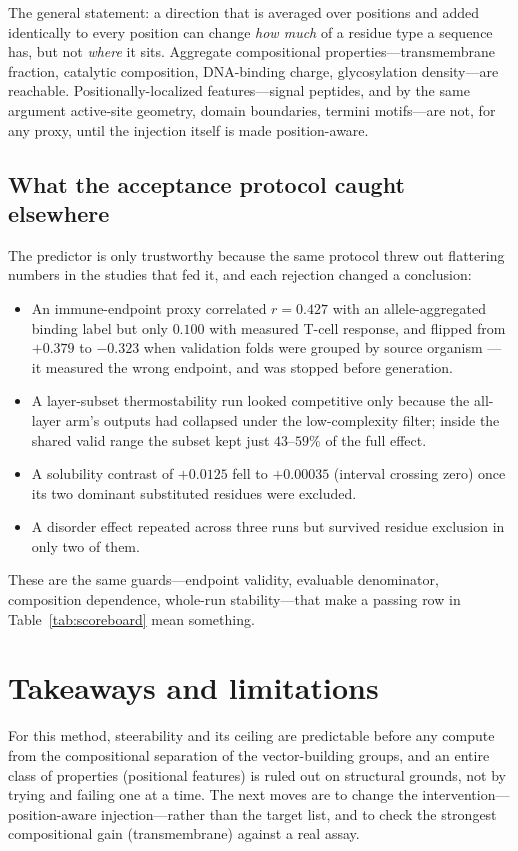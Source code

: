 \documentclass[11pt]{article}
\begin{document}
The general statement: a direction that is averaged over positions and added
identically to every position can change \emph{how much} of a residue type a
sequence has, but not \emph{where} it sits. Aggregate compositional
properties---transmembrane fraction, catalytic composition, DNA-binding charge,
glycosylation density---are reachable. Positionally-localized features---signal
peptides, and by the same argument active-site geometry, domain boundaries,
termini motifs---are not, for any proxy, until the injection itself is made
position-aware.

\subsection{What the acceptance protocol caught elsewhere}

The predictor is only trustworthy because the same protocol threw out flattering
numbers in the studies that fed it, and each rejection changed a conclusion:
\begin{itemize}\itemsep2pt
\item An immune-endpoint proxy correlated $r=0.427$ with an allele-aggregated
binding label but only $0.100$ with measured T-cell response, and flipped from
$+0.379$ to $-0.323$ when validation folds were grouped by source organism ---
it measured the wrong endpoint, and was stopped before generation.
\item A layer-subset thermostability run looked competitive only because the
all-layer arm's outputs had collapsed under the low-complexity filter; inside
the shared valid range the subset kept just $43$--$59\%$ of the full effect.
\item A solubility contrast of $+0.0125$ fell to $+0.00035$ (interval crossing
zero) once its two dominant substituted residues were excluded.
\item A disorder effect repeated across three runs but survived residue
exclusion in only two of them.
\end{itemize}
These are the same guards---endpoint validity, evaluable denominator,
composition dependence, whole-run stability---that make a passing row in
Table~\ref{tab:scoreboard} mean something.

\section{Takeaways and limitations}

For this method, steerability and its ceiling are predictable before any compute
from the compositional separation of the vector-building groups, and an entire
class of properties (positional features) is ruled out on structural grounds,
not by trying and failing one at a time. The next moves are to change the
intervention---position-aware injection---rather than the target list, and to
check the strongest compositional gain (transmembrane) against a real assay.
\end{document}
